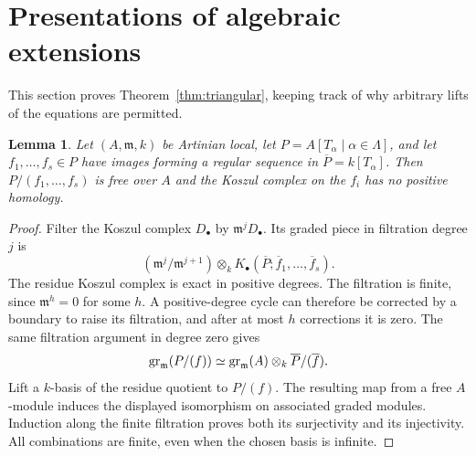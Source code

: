 \documentclass[11pt]{article}
\newtheorem{lemma}[theorem]{Lemma}
\theoremstyle{definition}\newtheorem{definition}[theorem]{Definition}
\theoremstyle{remark}\newtheorem{remark}[theorem]{Remark}
\begin{document}
\section{Presentations of algebraic extensions}

This section proves Theorem~\ref{thm:triangular}, keeping track of why arbitrary lifts of the equations are permitted.

\begin{lemma}\label{lem:koszul}
Let $(A,\mathfrak m,k)$ be Artinian local, let $P=A[T_\alpha\mid\alpha\in\Lambda]$, and let $f_1,\ldots,f_s\in P$ have images forming a regular sequence in $\overline P=k[T_\alpha]$. Then $P/(f_1,\ldots,f_s)$ is free over $A$ and the Koszul complex on the $f_i$ has no positive homology.
\end{lemma}
\begin{proof}
Filter the Koszul complex $D_\bullet$ by $\mathfrak m^jD_\bullet$. Its graded piece in filtration degree $j$ is
\[
 (\mathfrak m^j/\mathfrak m^{j+1})\otimes_k
 K_\bullet(\overline P;\overline f_1,\ldots,\overline f_s).
\]
The residue Koszul complex is exact in positive degrees. The filtration is finite, since $\mathfrak m^h=0$ for some $h$. A positive-degree cycle can therefore be corrected by a boundary to raise its filtration, and after at most $h$ corrections it is zero. The same filtration argument in degree zero gives
\[
 \operatorname{gr}_\mathfrak m(P/(f))
 \simeq\operatorname{gr}_\mathfrak m(A)\otimes_k\overline P/(\overline f).
\]
Lift a $k$-basis of the residue quotient to $P/(f)$. The resulting map from a free $A$-module induces the displayed isomorphism on associated graded modules. Induction along the finite filtration proves both its surjectivity and its injectivity. All combinations are finite, even when the chosen basis is infinite.
\end{proof}
\end{document}
